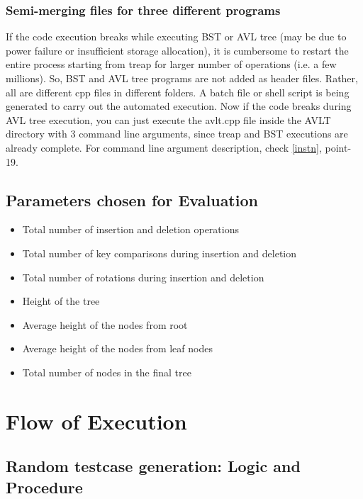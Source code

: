 \documentclass{article}
\begin{document}
\subsubsection{Semi-merging files for three different programs}
If the code execution breaks while executing BST or AVL tree (may be due to power failure or insufficient storage allocation), it is cumbersome to restart the entire process starting from treap for larger number of operations (i.e. a few millions). So, BST and AVL tree programs are not added as header files. Rather, all are different cpp files in different folders. A batch file or shell script is being generated to carry out the automated execution. Now if the code breaks during AVL tree execution, you can just execute the avlt.cpp file inside the AVLT directory with 3 command line arguments, since treap and BST executions are already complete. For command line argument description, check \ref{instn}, point-19.
\subsection{Parameters chosen for Evaluation}
\begin{itemize}
	\item Total number of insertion and deletion operations
	\item Total number of key comparisons during insertion and deletion
	\item Total number of rotations during insertion and deletion
	\item Height of the tree
	\item Average height of the nodes from root
	\item Average height of the nodes from leaf nodes
	\item Total number of nodes in the final tree
\end{itemize}



\section{Flow of Execution}
\subsection{Random testcase generation: Logic and Procedure}
\end{document}

